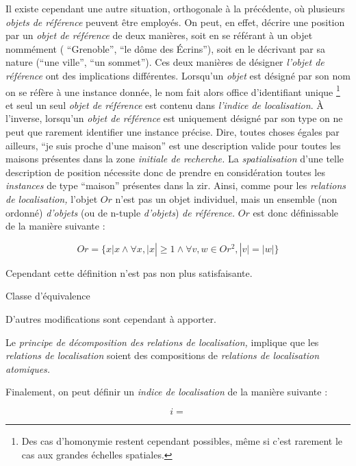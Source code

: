 Il existe cependant une autre situation, orthogonale à la précédente,
où plusieurs \emph{objets de référence} peuvent être employés. On
peut, en effet, décrire une position par un \emph{objet de référence}
de deux manières, soit en se référant à un objet nommément (\eg
\enquote{Grenoble}, \enquote{le dôme des Écrins}), soit en le
décrivant par sa nature (\eg \enquote{une ville}, \enquote{un
  sommet}). Ces deux manières de désigner \emph{l'objet de référence}
ont des implications différentes. Lorsqu'un \emph{objet} est désigné
par son nom on se réfère à une instance donnée, le nom fait alors
office d'identifiant unique \footnote{Des cas d’homonymie restent
  cependant possibles, même si c'est rarement le cas aux grandes
  échelles spatiales.} et seul un seul \emph{objet de référence} est
contenu dans \emph{l'indice de localisation}. À l'inverse, lorsqu'un
\emph{objet de référence} est uniquement désigné par son type on ne
peut que rarement identifier une instance précise. Dire, toutes choses
égales par ailleurs, \enquote{je suis proche d'une maison} est une
description valide pour toutes les maisons présentes dans la zone
\emph{initiale de recherche.} La \emph{spatialisation} d'une telle
description de position nécessite donc de prendre en considération
toutes les \emph{instances} de type \enquote{maison} présentes dans la
\ac{zir}. Ainsi, comme pour les \emph{relations de localisation,}
l'objet \(Or\) n'est pas un objet individuel, mais un ensemble (non
ordonné) \emph{d'objets} (ou de n-tuple \emph{d'objets}) \emph{de
  référence.} \(Or\) est donc définissable de la manière suivante :

\begin{equation}
  Or = \{ x | x \wedge \forall x, |x| ≥ 1 \wedge \forall v,w \in Or^2, |v| = |w|\}
\end{equation}

Cependant cette définition n'est pas non plus satisfaisante.

Classe d'équivalence


D'autres modifications sont cependant à apporter.

Le \emph{principe de décomposition des relations de localisation,}
implique que les \emph{relations de localisation} soient des
compositions de \emph{relations de localisation atomiques.}



Finalement, on peut définir un \emph{indice de localisation} de la
manière suivante :

\begin{equation}
  i =
\end{equation}

